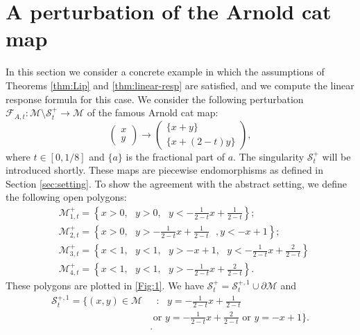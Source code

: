 \documentclass{amsart}
\numberwithin{equation}{section}
\newcommand\cF{{\mathcal F}}
\newcommand\cM{{\mathcal M}}
\newcommand\cS{{\mathcal S}}
\newcommand{\catt}{\cF_{A,t}}
\begin{document}
\section{A perturbation of the Arnold cat map}
\label{sec:examples}

In this section we consider a concrete example in which the assumptions of Theorems \ref{thm:Lip} and \ref{thm:linear-resp} are satisfied, and we compute the linear response formula for this case. We consider the following perturbation \(\catt: \cM \setminus \cS_t^{+} \to \cM\) of the famous Arnold cat map: 
\begin{equation}\label{eq:arnold-cat-map}
    \begin{pmatrix}x\\y 
\end{pmatrix} \to  \begin{pmatrix} \{x + y\}\\
\{x+(2-t)y\}\end{pmatrix},
\end{equation}
where \(t \in [0, 1/8]\) and \(\{a\}\) is the fractional part of \(a\). The singularity \(\cS_t^{+}\) will be introduced shortly. These maps are piecewise endomorphisms as defined in Section \ref{sec:setting}. To show the agreement with the abstract setting, we define the following open polygons:
\[
\begin{split}
  &\cM_{1,t}^+ = \left\{ x>0,\text{ } y>0,\text{ } y < -\frac{1}{2-t}x + \frac{1}{2-t}\right\};\\
  &\cM_{2,t}^+ = \left\{x > 0, \text{ }y > -\frac{1}{2-t}x + \frac{1}{2-t}\text{ }, y < -x+1 \right\};\\
  & \cM_{3,t}^+ = \left\{x < 1, \text{ }y<1, \text{ }y > -x+1, \text{ }y< -\frac{1}{2-t}x + \frac{2}{2-t}\right\} \\
  & \cM_{4,t}^+ = \left\{x < 1, \text{ }y<1, \text{ } y> -\frac{1}{2-t}x + \frac{2}{2-t}\right\}.
\end{split}  
\]
These polygons are plotted in \ref{Fig:1}. We have \(\cS_t^{+} = \cS_t^{+,1} \cup \partial \cM\) and
\begin{equation}
  \label{eq:SingCat+}
  \begin{split}
  \cS^{+,1}_t = \biggl\{(x, y) \in \cM& \text{ } : \text{ } y = -\frac{1}{2-t}x + \frac{1}{2-t} \\
&\text{ or }y = -\frac{1}{2-t}x + \frac{2}{2-t} \text{ or }y = -x +1 \biggr\}.\\
  &.
  \end{split}
\end{equation}
\end{document}
